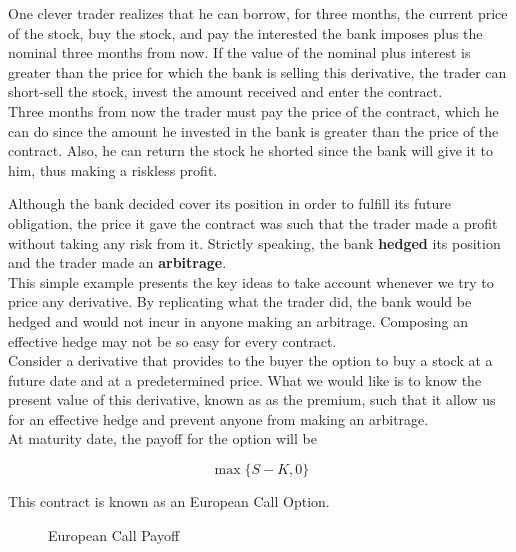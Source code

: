 \documentclass[11pt]{report}
\begin{document}
 One clever trader realizes that he can borrow, for three months, the current price of the stock, buy the stock, and pay the interested the bank imposes plus the nominal three months from now. If the value of the nominal plus interest is greater than the price for which the bank is selling this derivative, the trader can short-sell the stock, invest the amount received and enter the contract.\\
 
  Three months from now the trader must pay the price of the contract, which he can do since the amount he invested in the bank is greater than the price of the contract. Also, he can return the stock he shorted since the bank will give it to him, thus making a riskless profit.

Although the bank decided cover its position in order to fulfill its future obligation, the price it gave the contract was such that the trader made a profit without taking any risk from it. Strictly speaking, the bank \textbf{hedged} its position and the trader made an \textbf{arbitrage}.\\

This simple example presents the key ideas to take account whenever we try to price any derivative. By replicating what the trader did, the bank would be hedged and would not incur in anyone making an arbitrage. Composing an effective hedge may not be so easy for every contract.\\

Consider a derivative that provides to the buyer the option to buy a stock at a future date and at a predetermined price. What we would like is to know the present value of this derivative, known as as the premium, such that it allow us for an effective hedge and prevent anyone from making an arbitrage.\\

At maturity date, the payoff for the option will be

\begin{equation}
	\max\{S-K, 0\}
\end{equation}

This contract is known as an European Call Option.

\begin{figure}[h]
	\centering
	
	\caption{European Call Payoff}
\end{figure}

\newpage
\end{document}

